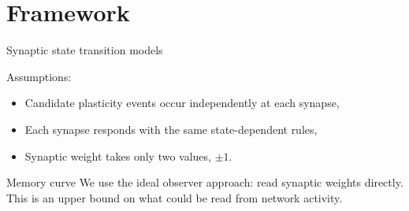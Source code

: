 \documentclass[final,hyperref={pdfpagelabels=false,bookmarks=false}]{beamer}
\newcommand{\pot}{^\text{pot}}
\newcommand{\dep}{^\text{dep}}
\newcommand{\frg}{^\text{forget}}
\newcommand{\eq}{\mathbf{p}^\infty}
\newcommand{\M}{\mathbf{M}}
\begin{document}
\begin{frame}{}
\begin{columns}[t]
\begin{column}{0.36\linewidth}
\section{Framework}


\begin{block}{Synaptic state transition models}
%
%
%
\parbox[c]{0.45\linewidth}{
}%
%
%
%
\parbox[c]{0.54\linewidth}{Assumptions:
\begin{itemize}
  \item Candidate plasticity events occur independently at each synapse,
  \item Each synapse responds with the same state-dependent rules,
  \item Synaptic weight takes only two values, $\pm1$.
 \end{itemize}
 }

%
\end{block}


\begin{block}{Memory curve}
%
 We use the ideal observer approach: read synaptic weights directly.
 This is an upper bound on what could be read from network activity.


\end{block}
\end{column}
\end{columns}
\end{frame}
\end{document}
